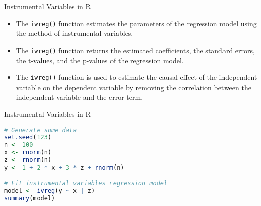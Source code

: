 \documentclass[serif, 9pt, aspectratio=32]{beamer}
\begin{document}
\begin{frame}{Instrumental Variables in R}
    \begin{itemize}
        \setlength{\itemsep}{2em}
        \item The \texttt{ivreg()} function estimates the parameters of the regression model using the method of instrumental variables.
        \item The \texttt{ivreg()} function returns the estimated coefficients, the standard errors, the t-values, and the p-values of the regression model.
        \item The \texttt{ivreg()} function is used to estimate the causal effect of the independent variable on the dependent variable by removing the correlation between the independent variable and the error term.
    \end{itemize}
\end{frame}

\begin{frame}[fragile]{Instrumental Variables in R}
    \begin{lstlisting}[language=R]
# Generate some data 
set.seed(123)
n <- 100
x <- rnorm(n)
z <- rnorm(n)
y <- 1 + 2 * x + 3 * z + rnorm(n)

# Fit instrumental variables regression model
model <- ivreg(y ~ x | z)
summary(model)
    \end{lstlisting}
\end{frame}
\end{document}
